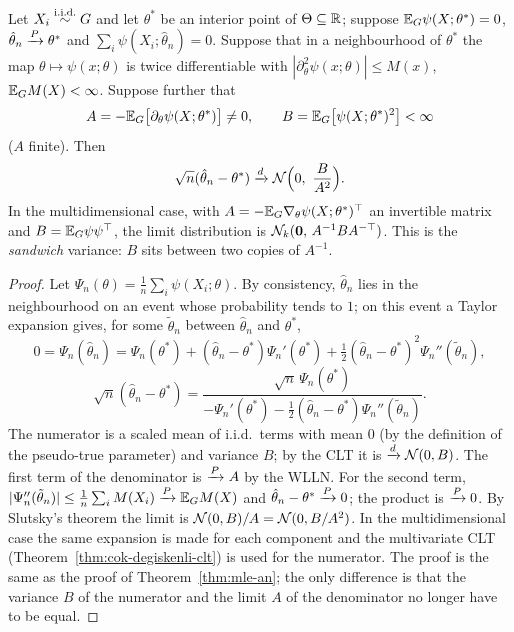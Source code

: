 \documentclass[main.tex]{subfiles}
\begin{document}
\begin{theorem}\label{thm:z-an}
Let $X_i\overset{\text{i.i.d.}}{\sim} G$ and let $\theta^*$ be an interior point of $\Theta\subseteq\mathbb{R}$; suppose $\mathbb{E}_G\psi(X;\theta^*)=0$, $\hat\theta_n\xrightarrow{P}\theta^*$ and $\sum_i\psi(X_i;\hat\theta_n)=0$. Suppose that in a neighbourhood of $\theta^*$ the map $\theta\mapsto\psi(x;\theta)$ is twice differentiable with $|\partial_\theta^2\psi(x;\theta)|\le M(x)$, $\mathbb{E}_GM(X)<\infty$. Suppose further that
\[
A=-\mathbb{E}_G\big[\partial_\theta\psi(X;\theta^*)\big]\neq0,\qquad B=\mathbb{E}_G\big[\psi(X;\theta^*)^2\big]<\infty
\]
($A$ finite). Then
\[
\sqrt n(\hat\theta_n-\theta^*)\xrightarrow{d}\mathcal{N}\Big(0,\ \frac{B}{A^2}\Big).
\]
In the multidimensional case, with $A=-\mathbb{E}_G\nabla_\theta\psi(X;\theta^*)^\top$ an invertible matrix and $B=\mathbb{E}_G\psi\psi^\top$, the limit distribution is $\mathcal{N}_k(\mathbf 0,\,A^{-1}BA^{-\top})$. This is the \emph{sandwich} variance: $B$ sits between two copies of $A^{-1}$.
\end{theorem}
\begin{proof}
Let $\Psi_n(\theta)=\frac1n\sum_i\psi(X_i;\theta)$. By consistency, $\hat\theta_n$ lies in the neighbourhood on an event whose probability tends to $1$; on this event a Taylor expansion gives, for some $\tilde\theta_n$ between $\hat\theta_n$ and $\theta^*$,
\[
0=\Psi_n(\hat\theta_n)=\Psi_n(\theta^*)+(\hat\theta_n-\theta^*)\Psi_n'(\theta^*)+\tfrac12(\hat\theta_n-\theta^*)^2\Psi_n''(\tilde\theta_n),
\]
\[
\sqrt n(\hat\theta_n-\theta^*)=\frac{\sqrt n\,\Psi_n(\theta^*)}{-\Psi_n'(\theta^*)-\frac12(\hat\theta_n-\theta^*)\Psi_n''(\tilde\theta_n)} .
\]
The numerator is a scaled mean of i.i.d.\ terms with mean $0$ (by the definition of the pseudo-true parameter) and variance $B$; by the CLT it is $\xrightarrow{d}\mathcal{N}(0,B)$. The first term of the denominator is $\xrightarrow{P} A$ by the WLLN. For the second term, $|\Psi_n''(\tilde\theta_n)|\le\frac1n\sum_iM(X_i)\xrightarrow{P}\mathbb{E}_GM(X)$ and $\hat\theta_n-\theta^*\xrightarrow{P}0$; the product is $\xrightarrow{P}0$. By Slutsky's theorem the limit is $\mathcal{N}(0,B)/A=\mathcal{N}(0,B/A^2)$. In the multidimensional case the same expansion is made for each component and the multivariate CLT (Theorem~\ref{thm:cok-degiskenli-clt}) is used for the numerator. The proof is the same as the proof of Theorem~\ref{thm:mle-an}; the only difference is that the variance $B$ of the numerator and the limit $A$ of the denominator no longer have to be equal.
\end{proof}
\end{document}
